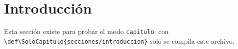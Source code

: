 \section{Introducción}

Esta sección existe para probar el modo \texttt{capitulo}: con
\verb|\def\SoloCapitulo{secciones/introduccion}| solo se compila este archivo.
